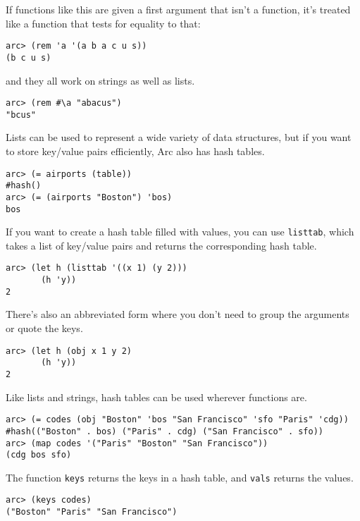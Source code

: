 \documentclass[a4paper,12pt]{book}
\begin{document}
If functions like this are given a first argument that isn't a
function, it's treated like a function that tests for equality to
that:

\begin{verbatim}
arc> (rem 'a '(a b a c u s))
(b c u s)
\end{verbatim}

and they all work on strings as well as lists.

\begin{verbatim}
arc> (rem #\a "abacus")
"bcus"
\end{verbatim}

Lists can be used to represent a wide variety of data structures,
but if you want to store key/value pairs efficiently, {\sc{}Arc} also has
hash tables.

\begin{verbatim}
arc> (= airports (table))         
#hash()
arc> (= (airports "Boston") 'bos)
bos
\end{verbatim}

If you want to create a hash table filled with values, you can use
\verb|listtab|, which takes a list of key/value pairs and returns the 
corresponding hash table.

\begin{verbatim}
arc> (let h (listtab '((x 1) (y 2)))
       (h 'y))
2
\end{verbatim}

There's also an abbreviated form where you don't need to group the
arguments or quote the keys.

\begin{verbatim}
arc> (let h (obj x 1 y 2)
       (h 'y))
2
\end{verbatim}

Like lists and strings, hash tables can be used wherever functions are.

\begin{verbatim}
arc> (= codes (obj "Boston" 'bos "San Francisco" 'sfo "Paris" 'cdg))
#hash(("Boston" . bos) ("Paris" . cdg) ("San Francisco" . sfo))
arc> (map codes '("Paris" "Boston" "San Francisco"))
(cdg bos sfo)
\end{verbatim}

The function \verb|keys| returns the keys in a hash table, and \verb|vals| returns
the values.  

\begin{verbatim}
arc> (keys codes)
("Boston" "Paris" "San Francisco")
\end{verbatim}
\end{document}
